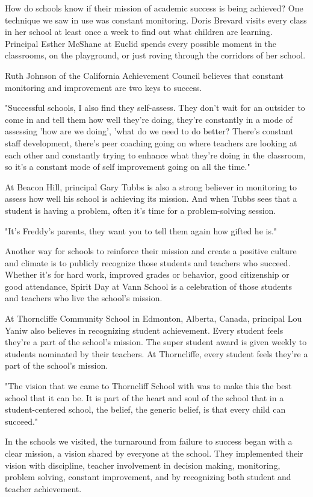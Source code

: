 How do schools know if their mission of academic success is being achieved? One technique we saw in use was constant monitoring. Doris Brevard visits every class in her school at least once a week to find out what children are learning. Principal Esther McShane at Euclid spends every possible moment in the classrooms, on the playground, or just roving through the corridors of her school.

Ruth Johnson of the California Achievement Council believes that constant monitoring and improvement are two keys to success.

"Successful schools, I also find they self-assess. They don't wait for an outsider to come in and tell them how well they're doing, they're constantly in a mode of assessing 'how are we doing', 'what do we need to do better? There's constant staff development, there's peer coaching going on where teachers are looking at each other and constantly trying to enhance what they're doing in the classroom, so it's a constant mode of self improvement going on all the time."

At Beacon Hill, principal Gary Tubbs is also a strong believer in monitoring to assess how well his school is achieving its mission. And when Tubbs sees that a student is having a problem, often it's time for a problem-solving session.

"It's Freddy's parents, they want you to tell them again how gifted he is."

Another way for schools to reinforce their mission and create a positive culture and climate is to publicly recognize those students and teachers who succeed. Whether it's for hard work, improved grades or behavior, good citizenship or good attendance, Spirit Day at Vann School is a celebration of those students and teachers who live the school's mission.

At Thorncliffe Community School in Edmonton, Alberta, Canada, principal Lou Yaniw also believes in recognizing student achievement. Every student feels they're a part of the school's mission. The super student award is given weekly to students nominated by their teachers. At Thorncliffe, every student feels they're a part of the school's mission.

"The vision that we came to Thorncliff School with was to make this the best school that it can be. It is part of the heart and soul of the school that in a student-centered school, the belief, the generic belief, is that every child can succeed."

In the schools we visited, the turnaround from failure to success began with a clear mission, a vision shared by everyone at the school. They implemented their vision with discipline, teacher involvement in decision making, monitoring, problem solving, constant improvement, and by recognizing both student and teacher achievement.

